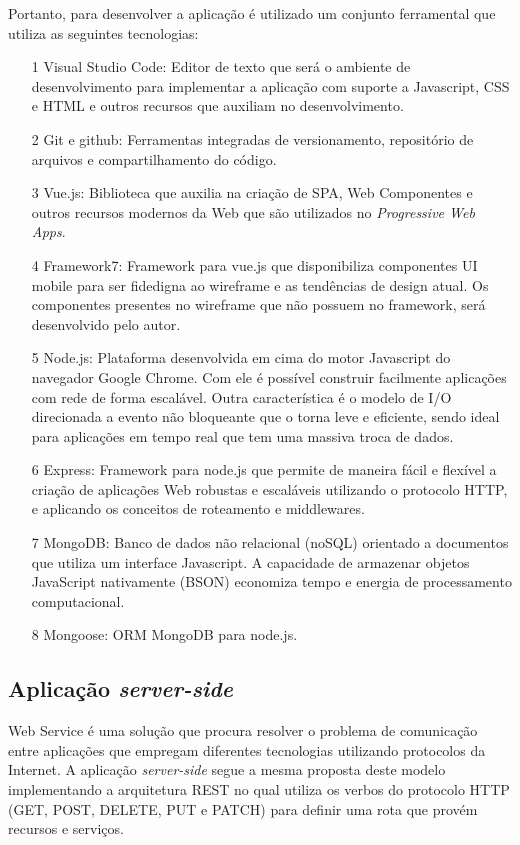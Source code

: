 Portanto, para desenvolver a aplicação é utilizado um conjunto ferramental que utiliza as seguintes tecnologias:

\begin{enumerate}
	\item [1] Visual Studio Code: Editor de texto que será o ambiente de desenvolvimento para implementar a  aplicação com suporte a Javascript, CSS e HTML e outros recursos que auxiliam no desenvolvimento.
	\item [2] Git e github: Ferramentas integradas de versionamento, repositório de arquivos e compartilhamento do código.
	\item [3] Vue.js: Biblioteca que auxilia na criação de SPA, Web Componentes e outros recursos modernos da Web que são utilizados no \textit{Progressive Web Apps}.
	\item [4] Framework7: Framework para vue.js que disponibiliza componentes UI mobile para ser fidedigna ao wireframe e as tendências de design atual. Os componentes presentes no wireframe que não possuem no framework, será desenvolvido pelo autor.
	\item [5] Node.js: Plataforma desenvolvida em cima do motor Javascript do navegador Google Chrome. Com ele é possível construir facilmente aplicações com rede de forma escalável. Outra característica é o modelo de I/O direcionada a evento não bloqueante que o torna leve e eficiente, sendo ideal para aplicações em tempo real que tem uma massiva troca de dados.
	\item [6] Express:  Framework para node.js que permite de maneira fácil e flexível a criação de aplicações Web robustas e escaláveis utilizando o protocolo HTTP, e aplicando os conceitos de roteamento e middlewares.
	\item [7] MongoDB: Banco de dados não relacional (noSQL) orientado a documentos que utiliza um interface Javascript. A capacidade de armazenar objetos JavaScript nativamente (BSON) economiza tempo e energia de processamento computacional.
	\item [8] Mongoose: ORM MongoDB para node.js.

\end{enumerate}

\subsection{\esp Aplicação \textit{server-side}}

Web Service é uma solução que procura resolver o problema de comunicação entre aplicações que empregam diferentes tecnologias utilizando protocolos da Internet. A aplicação \textit{server-side} segue a mesma proposta deste modelo implementando a arquitetura REST no qual utiliza os verbos do protocolo HTTP (GET, POST, DELETE, PUT e PATCH) para definir uma rota que provém recursos e serviços.

